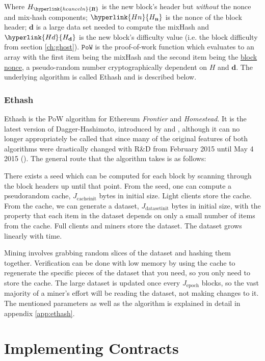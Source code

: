 \documentclass[9pt,oneside]{amsart}
\newcommand{\hcancel}[1]{%
    \tikz[baseline=(tocancel.base)]{
        \node[inner sep=0pt,outer sep=0pt] (tocancel) {#1};
        \draw[black] (tocancel.south west) -- (tocancel.north east);
    }%
}%
\begin{document}
\begin{multicols}{2}
Where $H_{\hyperlink{h cancel n}{\hcancel{n}}}$ is the new block's header but \textit{without} the nonce and mix-hash components; $\hyperlink{H n}{H_\mathbf{n}}$ is the nonce of the block header; $\mathbf{d}$ is a large data set needed to compute the mixHash and $\hyperlink{H d}{H_\mathbf{d}}$ is the new block's difficulty value (i.e. the block difficulty from section \ref{ch:ghost}). $\mathtt{PoW}$ is the proof-of-work function which evaluates to an array with the first item being the mixHash and the second item being the \hyperlink{block nonce}{block nonce}, a pseudo-random number cryptographically dependent on $H$ and $\mathbf{d}$. The underlying algorithm is called Ethash and is described below.
\subsubsection{Ethash}
Ethash is the PoW algorithm for Ethereum \textit{Frontier} and \textit{Homestead}. It is the latest version of Dagger-Hashimoto, introduced by \cite{dagger} and \cite{hashimoto}, although it can no longer appropriately be called that since many of the original features of both algorithms were drastically changed with R\&D from February 2015 until May 4 2015 (\cite{commitdateforEthash}). The general route that the algorithm takes is as follows:

There exists a seed which can be computed for each block by scanning through the block headers up until that point. From the seed, one can compute a pseudorandom cache, \hyperlink{Jcacheinit}{$J_{\mathrm{cacheinit}}$} bytes in initial size. Light clients store the cache. From the cache, we can generate a dataset, \hyperlink{Jdatasetinit}{$J_{\mathrm{datasetinit}}$} bytes in initial size, with the property that each item in the dataset depends on only a small number of items from the cache. Full clients and miners store the dataset. The dataset grows linearly with time.

Mining involves grabbing random slices of the dataset and hashing them together. Verification can be done with low memory by using the cache to regenerate the specific pieces of the dataset that you need, so you only need to store the cache. The large dataset is updated once every \hyperlink{Jepoch}{$J_{\mathrm{epoch}}$} blocks, so the vast majority of a miner's effort will be reading the dataset, not making changes to it. The mentioned parameters as well as the algorithm is explained in detail in appendix \ref{app:ethash}.

\section{Implementing Contracts}


\end{multicols}
\end{document}

